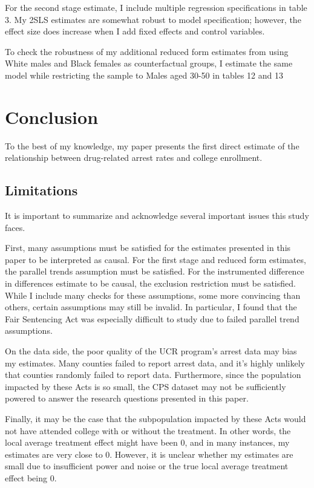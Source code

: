 \documentclass{article}
\begin{document}
For the second stage estimate, I include multiple regression specifications in table 3. My 2SLS estimates are somewhat robust to model specification; however, the effect size does increase when I add fixed effects and control variables.

To check the robustness of my additional reduced form estimates from using White males and Black females as counterfactual groups, I estimate the same model while restricting the sample to Males aged 30-50 in tables 12 and 13


\section{Conclusion}

To the best of my knowledge, my paper presents the first direct estimate of the relationship between drug-related arrest rates and college enrollment.

\subsection{Limitations}

It is important to summarize and acknowledge several important issues this study faces.

First, many assumptions must be satisfied for the estimates presented in this paper to be interpreted as causal. For the first stage and reduced form estimates, the parallel trends assumption must be satisfied. For the instrumented difference in differences estimate to be causal, the exclusion restriction must be satisfied. While I include many checks for these assumptions, some more convincing than others, certain assumptions may still be invalid. In particular, I found that the Fair Sentencing Act was especially difficult to study due to failed parallel trend assumptions.

On the data side, the poor quality of the UCR program's arrest data may bias my estimates. Many counties failed to report arrest data, and it's highly unlikely that counties randomly failed to report data. Furthermore, since the population impacted by these Acts is so small, the CPS dataset may not be sufficiently powered to answer the research questions presented in this paper.

Finally, it may be the case that the subpopulation impacted by these Acts would not have attended college with or without the treatment. In other words, the local average treatment effect might have been 0, and in many instances, my estimates are very close to 0. However, it is unclear whether my estimates are small due to insufficient power and noise or the true local average treatment effect being 0.
\end{document}
